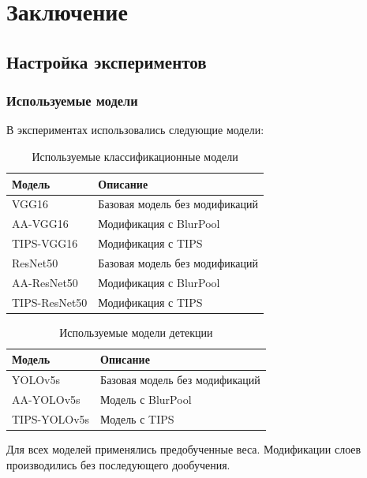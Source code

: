 \section{Заключение}
\label{sec:Chapter5} 

\subsection{Настройка экспериментов}
\label{sec:experiments:setup}

\subsubsection{Используемые модели}
\label{sec:experiments:setup:models}

В экспериментах использовались следующие модели:

\begin{table}[ht]
\centering
\caption{Используемые классификационные модели}
\label{tab:classification_models}
\begin{tabular}{|l|p{}|}
\hline
\textbf{Модель} & \textbf{Описание} \\ \hline
VGG16 & Базовая модель без модификаций \\ \hline
AA-VGG16 & Модификация с BlurPool \\ \hline
TIPS-VGG16 & Модификация с TIPS \\ \hline
ResNet50 & Базовая модель без модификаций \\ \hline
AA-ResNet50 & Модификация с BlurPool \\ \hline
TIPS-ResNet50 & Модификация с TIPS \\ \hline
\end{tabular}
\end{table}

\begin{table}[ht]
\centering
\caption{Используемые модели детекции}
\label{tab:detection_models}
\begin{tabular}{|l|p{}|}
\hline
\textbf{Модель} & \textbf{Описание} \\ \hline
YOLOv5s & Базовая модель без модификаций \\ \hline
AA-YOLOv5s & Модель с BlurPool \\ \hline
TIPS-YOLOv5s & Модель с TIPS \\ \hline
\end{tabular}
\end{table}

Для всех моделей применялись предобученные веса. Модификации слоев производились без последующего дообучения.

